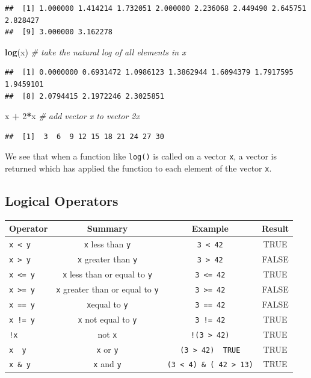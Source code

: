 \documentclass[]{book}
\newenvironment{Shaded}{\begin{snugshade}}{\end{snugshade}}
\newcommand{\KeywordTok}[1]{\textcolor[rgb]{0.13,0.29,0.53}{\textbf{#1}}}
\newcommand{\DecValTok}[1]{\textcolor[rgb]{0.00,0.00,0.81}{#1}}
\newcommand{\StringTok}[1]{\textcolor[rgb]{0.31,0.60,0.02}{#1}}
\newcommand{\CommentTok}[1]{\textcolor[rgb]{0.56,0.35,0.01}{\textit{#1}}}
\newcommand{\OperatorTok}[1]{\textcolor[rgb]{0.81,0.36,0.00}{\textbf{#1}}}
\newcommand{\NormalTok}[1]{#1}
\begin{document}
\begin{verbatim}
##  [1] 1.000000 1.414214 1.732051 2.000000 2.236068 2.449490 2.645751 2.828427
##  [9] 3.000000 3.162278
\end{verbatim}

\begin{Shaded}
\begin{Highlighting}[]
\KeywordTok{log}\NormalTok{(x)    }\CommentTok{# take the natural log of all elements in x}
\end{Highlighting}
\end{Shaded}

\begin{verbatim}
##  [1] 0.0000000 0.6931472 1.0986123 1.3862944 1.6094379 1.7917595 1.9459101
##  [8] 2.0794415 2.1972246 2.3025851
\end{verbatim}

\begin{Shaded}
\begin{Highlighting}[]
\NormalTok{x }\OperatorTok{+}\StringTok{ }\DecValTok{2}\OperatorTok{*}\NormalTok{x   }\CommentTok{# add vector x to vector 2x}
\end{Highlighting}
\end{Shaded}

\begin{verbatim}
##  [1]  3  6  9 12 15 18 21 24 27 30
\end{verbatim}

We see that when a function like \texttt{log()} is called on a vector
\texttt{x}, a vector is returned which has applied the function to each
element of the vector \texttt{x}.

\subsection{Logical Operators}\label{logical-operators}

\begin{longtable}[]{@{}lccc@{}}
\toprule
Operator & Summary & Example & Result\tabularnewline
\midrule
\endhead
\texttt{x\ \textless{}\ y} & \texttt{x} less than \texttt{y} &
\texttt{3\ \textless{}\ 42} & TRUE\tabularnewline
\texttt{x\ \textgreater{}\ y} & \texttt{x} greater than \texttt{y} &
\texttt{3\ \textgreater{}\ 42} & FALSE\tabularnewline
\texttt{x\ \textless{}=\ y} & \texttt{x} less than or equal to
\texttt{y} & \texttt{3\ \textless{}=\ 42} & TRUE\tabularnewline
\texttt{x\ \textgreater{}=\ y} & \texttt{x} greater than or equal to
\texttt{y} & \texttt{3\ \textgreater{}=\ 42} & FALSE\tabularnewline
\texttt{x\ ==\ y} & \texttt{x}equal to \texttt{y} & \texttt{3\ ==\ 42} &
FALSE\tabularnewline
\texttt{x\ !=\ y} & \texttt{x} not equal to \texttt{y} &
\texttt{3\ !=\ 42} & TRUE\tabularnewline
\texttt{!x} & not \texttt{x} & \texttt{!(3\ \textgreater{}\ 42)} &
TRUE\tabularnewline
\texttt{x\ \textbar{}\ y} & \texttt{x} or \texttt{y} &
\texttt{(3\ \textgreater{}\ 42)\ \textbar{}\ TRUE} & TRUE\tabularnewline
\texttt{x\ \&\ y} & \texttt{x} and \texttt{y} &
\texttt{(3\ \textless{}\ 4)\ \&\ (\ 42\ \textgreater{}\ 13)} &
TRUE\tabularnewline
\bottomrule
\end{longtable}
\end{document}

